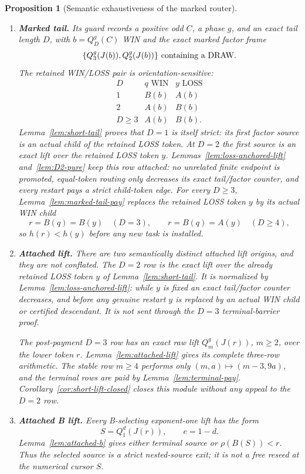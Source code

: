 \documentclass[11pt]{article}
\newtheorem{proposition}[theorem]{Proposition}
\newcommand{\DRAW}{\ensuremath{\mathrm{DRAW}}}
\begin{document}
\begin{proposition}[Semantic exhaustiveness of the marked router]
\begin{enumerate}[label=\textnormal{(S\arabic*)},leftmargin=*]
\item \textbf{Marked tail.}  Its guard records a positive odd $C$, a phase $g$,
and an exact tail length $D$, with $b=Q_D^g(C)$ WIN and the exact marked
factor frame
\[
 \{Q_3^g(J(b)),Q_2^g(J(b))\}\text{ containing a \DRAW}.
\]
The retained WIN/LOSS pair is orientation-sensitive:
\[
\begin{array}{c|cc}
D&q\text{ WIN}&y\text{ LOSS}\\ \hline
1&B(b)&A(b)\\
2&A(b)&B(b)\\
D\ge3&A(b)&B(b).
\end{array}
\]
Lemma~\ref{lem:short-tail} proves that $D=1$ is itself strict: its first
factor source is an actual child of the retained LOSS token.  At $D=2$ the first source is an exact lift over the retained LOSS token
$y$. Lemmas~\ref{lem:loss-anchored-lift} and~\ref{lem:D2-pure} keep this
row attached: no unrelated finite endpoint is promoted, equal-token routing
only decreases its exact tail/factor counter, and every restart pays a strict
child-token edge.  For every $D\ge3$,
Lemma~\ref{lem:marked-tail-pay} replaces the retained LOSS token $y$ by its
actual WIN child
\[
 r=B(q)=B(y)\quad(D=3),\qquad
 r=B(q)=A(y)\quad(D\ge4),
\]
so $h(r)<h(y)$ before any new task is installed.

\item \textbf{Attached lift.}  There are two semantically distinct attached
lift origins, and they are not conflated.  The $D=2$ row is the exact lift over the already retained LOSS token $y$ of
Lemma~\ref{lem:short-tail}. It is normalized by
Lemma~\ref{lem:loss-anchored-lift}: while $y$ is fixed an exact tail/factor
counter decreases, and before any genuine restart $y$ is replaced by an
actual WIN child or certified descendant. It is not sent through the $D=3$
terminal-barrier proof.

The post-payment $D=3$ row has an exact raw lift $Q_m^g(J(r))$, $m\ge2$,
over the lower token $r$. Lemma~\ref{lem:attached-lift} gives its complete
three-row arithmetic.  The stable row $m\ge4$ performs only
$(m,a)\mapsto(m-3,9a)$, and the terminal rows are paid by
Lemma~\ref{lem:terminal-pay}.  Corollary~\ref{cor:short-lift-closed} closes
this module without any appeal to the $D=2$ row.

\item \textbf{Attached B lift.}  Every B-selecting exponent-one lift has the
form
\[
 S=Q_1^d(J(r)),\qquad e=1-d.
\]
Lemma~\ref{lem:attached-b} gives either terminal source or
$\rho(B(S))<r$.  Thus the selected source is a strict nested-source exit;
it is not a free reseed at the numerical cursor $S$.


\end{enumerate}
\end{proposition}
\end{document}
